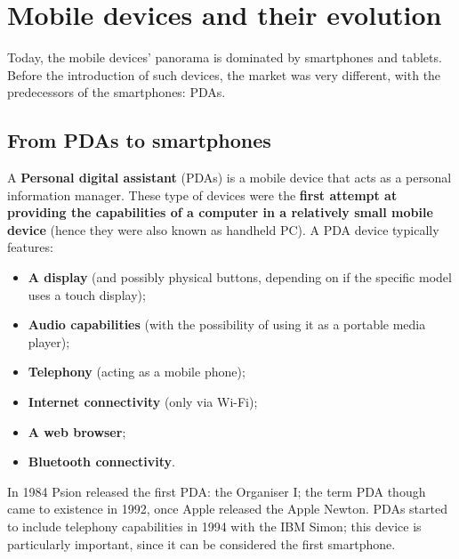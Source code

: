 \section{Mobile devices and their evolution}
Today, the mobile devices' panorama is dominated by smartphones and tablets. Before the introduction of such devices, the market was very different, with the predecessors of the smartphones: PDAs.

\subsection{From PDAs to smartphones}\label{from_pdas_to_smartphones}
A \textbf{Personal digital assistant} (PDAs) is a mobile device that acts as a personal information manager. These type of devices were the \textbf{first attempt at providing the capabilities of a computer in a relatively small mobile device} (hence they were also known as handheld PC). A PDA device typically features:
\begin{itemize}
    \item \textbf{A display} (and possibly physical buttons, depending on if the specific model uses a touch display);
    \item \textbf{Audio capabilities} (with the possibility of using it as a portable media player);
    \item \textbf{Telephony} (acting as a mobile phone);
    \item \textbf{Internet connectivity} (only via Wi-Fi);
    \item \textbf{A web browser};
    \item \textbf{Bluetooth connectivity}.
\end{itemize}

In 1984 Psion released the first PDA: the Organiser I; the term PDA though came to existence in 1992, once Apple released the Apple Newton. PDAs started to include telephony capabilities in 1994 with the IBM Simon; this device is particularly important, since it can be considered the first smartphone.
\vspace{5mm}

